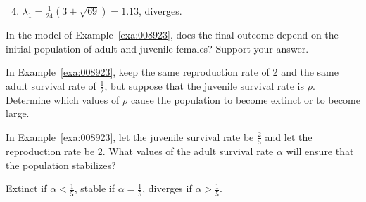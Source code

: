 \begin{multicols}{2}
\begin{ex}
\begin{sol}
\begin{enumerate}[label={\alph*.}]
\setcounter{enumi}{3}
\item  $\lambda_1 = \frac{1}{24} (3+\sqrt{69}) = 1.13$, diverges.

\end{enumerate}
\end{sol}
\end{ex}

\begin{ex}
In the model of Example~\ref{exa:008923}, does the final outcome depend on the initial population of adult and juvenile females? Support your answer.
\end{ex}

\begin{ex}
In Example~\ref{exa:008923}, keep the same reproduction rate of 2 and the same adult survival rate of $\frac{1}{2}$, but suppose that the juvenile survival rate is $\rho$. Determine which values of $\rho$ cause the population to become extinct or to become large.
\end{ex}

\begin{ex}
In Example~\ref{exa:008923}, let the juvenile survival rate be $\frac{2}{5}$
 and let the reproduction rate be 2. What values of the adult survival rate $\alpha$ will ensure that the population stabilizes?

\begin{sol}
Extinct if $\alpha < \frac{1}{5}$, stable if $\alpha = \frac{1}{5}$, diverges if $\alpha > \frac{1}{5}$.
\end{sol}
\end{ex}

\end{multicols}








